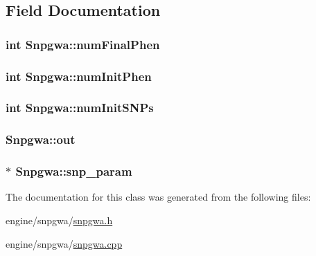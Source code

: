 \subsection{Field Documentation}
\hypertarget{classSnpgwa_a02d3778a5605bd3fa13b2ff48c87382a}{
\subsubsection[{numFinalPhen}]{\setlength{\rightskip}{0pt plus 5cm}int {\bf Snpgwa::numFinalPhen}}}
\label{classSnpgwa_a02d3778a5605bd3fa13b2ff48c87382a}
\hypertarget{classSnpgwa_a8354d2686850eab77dd904721dd274f7}{
\subsubsection[{numInitPhen}]{\setlength{\rightskip}{0pt plus 5cm}int {\bf Snpgwa::numInitPhen}}}
\label{classSnpgwa_a8354d2686850eab77dd904721dd274f7}
\hypertarget{classSnpgwa_ad2186220f31270d57c707e2ab845f805}{
\subsubsection[{numInitSNPs}]{\setlength{\rightskip}{0pt plus 5cm}int {\bf Snpgwa::numInitSNPs}}}
\label{classSnpgwa_ad2186220f31270d57c707e2ab845f805}
\hypertarget{classSnpgwa_a6c7b080ebb55447368f6f4fc7b6e44b4}{
\subsubsection[{out}]{ {\bf Snpgwa::out}}}
\label{classSnpgwa_a6c7b080ebb55447368f6f4fc7b6e44b4}
\hypertarget{classSnpgwa_a9b2d0153adca8f2c195316160a5f5e6b}{
\subsubsection[{snp\_\-param}]{$\ast$ {\bf Snpgwa::snp\_\-param}}}
\label{classSnpgwa_a9b2d0153adca8f2c195316160a5f5e6b}


The documentation for this class was generated from the following files:\begin{DoxyCompactItemize}
\item 
engine/snpgwa/\hyperlink{snpgwa_8h}{snpgwa.h}\item 
engine/snpgwa/\hyperlink{snpgwa_8cpp}{snpgwa.cpp}\end{DoxyCompactItemize}
